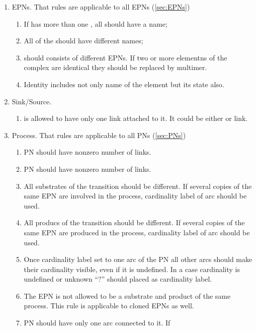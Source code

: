 \begin{enumerate}
  \item EPNs. That rules are applicable to all EPNs (\ref{sec:EPNs})
  \begin{enumerate}
    \item If  has more than one , 
    all  should have a name;
    \item All  of the  should have 
    different names;
    \item {} should consists of different EPNs. If two or more 
    elementns of the complex are identical they should be replaced by multimer. 
    \item Identity includes not only name of the element but its state also.
  \end{enumerate}
  \item Sink/Source.
  \begin{enumerate}
    \item {} is allowed to have only one link attached to it. It
    could be either  or  link.
  \end{enumerate}
    \item Process. That rules are applicable to all PNs (\ref{sec:PNs})
  \begin{enumerate}
    \item PN should have nonzero number of  links.
    \item PN should have nonzero number of  links.
    \item All substrates of the transition should be different. If several 
    copies of the same EPN are involved in the process, cardinality label of 
     arc should be used.
    \item All producs of the transition should be different. If several copies 
    of the same EPN are produced in the process, cardinality label of 
     arc should be used.
    \item Once cardinality label set to one arc of the PN all other arcs should
    make their cardinality visible, even if it is undefined. In a case
    cardinality is undefined or unknown ``?'' should placed as cardinality label.
    \item The EPN is not allowed to be a substrate and product of the same 
    process. This rule is applicable to cloned EPNs as well.
    \item PN should have only one  arc connected to it. If

\end{enumerate}
\end{enumerate}
